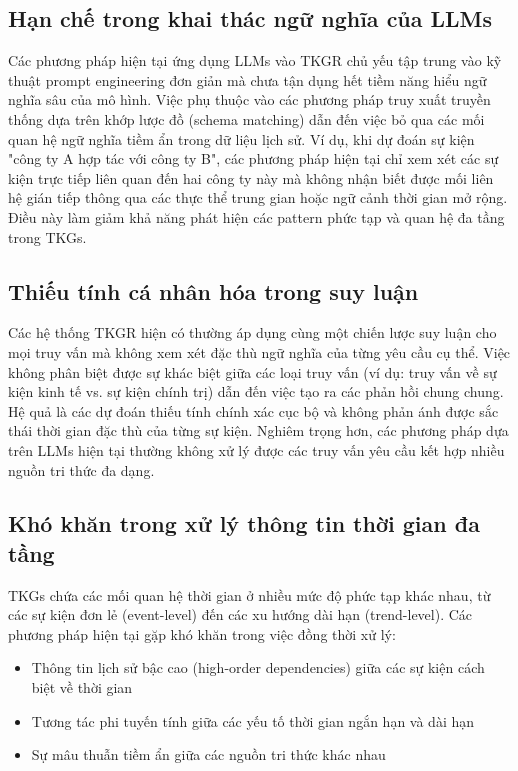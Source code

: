 \subsection{Hạn chế trong khai thác ngữ nghĩa của LLMs}
Các phương pháp hiện tại ứng dụng LLMs vào TKGR chủ yếu tập trung vào kỹ thuật prompt engineering đơn giản mà chưa tận dụng hết tiềm năng hiểu ngữ nghĩa sâu của mô hình. Việc phụ thuộc vào các phương pháp truy xuất truyền thống dựa trên khớp lược đồ (schema matching) dẫn đến việc bỏ qua các mối quan hệ ngữ nghĩa tiềm ẩn trong dữ liệu lịch sử. Ví dụ, khi dự đoán sự kiện "công ty A hợp tác với công ty B", các phương pháp hiện tại chỉ xem xét các sự kiện trực tiếp liên quan đến hai công ty này mà không nhận biết được mối liên hệ gián tiếp thông qua các thực thể trung gian hoặc ngữ cảnh thời gian mở rộng. Điều này làm giảm khả năng phát hiện các pattern phức tạp và quan hệ đa tầng trong TKGs.

\subsection{Thiếu tính cá nhân hóa trong suy luận}
Các hệ thống TKGR hiện có thường áp dụng cùng một chiến lược suy luận cho mọi truy vấn mà không xem xét đặc thù ngữ nghĩa của từng yêu cầu cụ thể. Việc không phân biệt được sự khác biệt giữa các loại truy vấn (ví dụ: truy vấn về sự kiện kinh tế vs. sự kiện chính trị) dẫn đến việc tạo ra các phản hồi chung chung. Hệ quả là các dự đoán thiếu tính chính xác cục bộ và không phản ánh được sắc thái thời gian đặc thù của từng sự kiện. Nghiêm trọng hơn, các phương pháp dựa trên LLMs hiện tại thường không xử lý được các truy vấn yêu cầu kết hợp nhiều nguồn tri thức đa dạng.

\subsection{Khó khăn trong xử lý thông tin thời gian đa tầng}
TKGs chứa các mối quan hệ thời gian ở nhiều mức độ phức tạp khác nhau, từ các sự kiện đơn lẻ (event-level) đến các xu hướng dài hạn (trend-level). Các phương pháp hiện tại gặp khó khăn trong việc đồng thời xử lý:
\begin{itemize}
    \item Thông tin lịch sử bậc cao (high-order dependencies) giữa các sự kiện cách biệt về thời gian
    \item Tương tác phi tuyến tính giữa các yếu tố thời gian ngắn hạn và dài hạn
    \item Sự mâu thuẫn tiềm ẩn giữa các nguồn tri thức khác nhau
\end{itemize}

